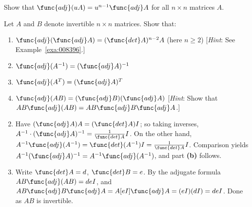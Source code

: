 \begin{multicols}{2}
\begin{ex}
Show that $\func{adj}(uA) = u^{n-1} \func{adj }A$ for all $n \times n$ matrices $A$.
\end{ex}

\begin{ex}
Let $A$ and $B$ denote invertible $n \times n$ matrices. Show that:


\begin{enumerate}[label={\alph*.}]
\item $\func{adj}(\func{adj }A) = (\func{det }A)^{n-2}A$ (here $n \geq 2$) [\textit{Hint}: See Example~\ref{exa:008396}.]

\item $\func{adj}(A^{-1}) = (\func{adj }A)^{-1}$

\item $\func{adj}(A^{T}) = (\func{adj }A)^T$

\item $\func{adj}(AB) = (\func{adj }B)(\func{adj }A)$ [\textit{Hint}: Show that $AB \func{adj}(AB) = AB \func{adj }B \func{adj }A$.]

\end{enumerate}
\begin{sol}
\begin{enumerate}[label={\alph*.}]
\setcounter{enumi}{1}
\item  Have $(\func{adj }A)A = (\func{det }A)I$; so taking inverses, $A^{-1} \cdot (\func{adj } A)^{-1} = \frac{1}{\func{det } A}I$.
 On the other hand, $A^{-1} \func{adj} (A^{-1}) = \func{det}(A^{-1})I = \frac{1}{\func{det } A}I$.
 Comparison yields $A^{-1}(\func{adj }A)^{-1} = A^{-1}\func{adj}(A^{-1})$, and part \textbf{(b)} follows.

\setcounter{enumi}{3}
\item  Write $\func{det} A = d$, $\func{det } B = e$. By the adjugate formula $AB \func{adj}(AB) = deI$, and $AB \func{adj }B \func{adj }A = A[eI] \func{adj} A = (eI)(dI) = deI$. Done as $AB$ is invertible.

\end{enumerate}
\end{sol}
\end{ex}

\end{multicols}




